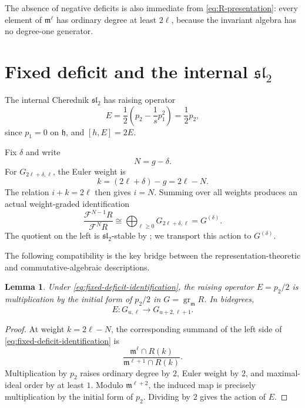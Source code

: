 \documentclass[11pt]{article}
\newtheorem{lemma}[theorem]{Lemma}
\newcommand{\gr}{\operatorname{gr}}
\begin{document}
The absence of negative deficits is also immediate from
\eqref{eq:R-presentation}: every element of $\mathfrak m^\ell$ has
ordinary degree at least $2\ell$, because the invariant algebra has no
degree-one generator.

\section{Fixed deficit and the internal \texorpdfstring{$\mathfrak{sl}_2$}{sl2}}
\label{sec:sl2}

The internal Cherednik $\mathfrak{sl}_2$ has raising operator
\begin{equation}\label{eq:E-p2}
 E=\frac12\left(p_2-\frac1s p_1^2\right)=\frac12p_2,
\end{equation}
since $p_1=0$ on $\mathfrak h$, and $[h,E]=2E$.

Fix $\delta$ and write
\[
 N=g-\delta.
\]
For $G_{2\ell+\delta,\ell}$, the Euler weight is
\[
 k=(2\ell+\delta)-g=2\ell-N.
\]
The relation $i+k=2\ell$ then gives $i=N$.  Summing over all weights
produces an actual weight-graded identification
\begin{equation}\label{eq:fixed-deficit-identification}
 \frac{\mathcal F^{N-1}R}{\mathcal F^NR}
 \cong
 \bigoplus_{\ell\geq0}G_{2\ell+\delta,\ell}
 =G^{(\delta)}.
\end{equation}
The quotient on the left is $\mathfrak{sl}_2$-stable by
\cite[Proposition~4.5]{GORS}; we transport this action to
$G^{(\delta)}$.

The following compatibility is the key bridge between the
representation-theoretic and commutative-algebraic descriptions.

\begin{lemma}\label{lem:E-compatibility}
Under \eqref{eq:fixed-deficit-identification}, the raising operator
$E=p_2/2$ is multiplication by the initial form of $p_2/2$ in
$G=\gr_{\mathfrak m}R$.  In bidegrees,
\begin{equation}\label{eq:E-bidegree}
 E:G_{u,\ell}\longrightarrow G_{u+2,\ell+1}.
\end{equation}
\end{lemma}

\begin{proof}
At weight $k=2\ell-N$, the corresponding summand of the left side of
\eqref{eq:fixed-deficit-identification} is
\[
 \frac{\mathfrak m^\ell\cap R(k)}
      {\mathfrak m^{\ell+1}\cap R(k)}.
\]
Multiplication by $p_2$ raises ordinary degree by $2$, Euler weight by
$2$, and maximal-ideal order by at least $1$.  Modulo
$\mathfrak m^{\ell+2}$, the induced map is precisely multiplication by
the initial form of $p_2$.  Dividing by $2$ gives the action of $E$.
\end{proof}
\end{document}

